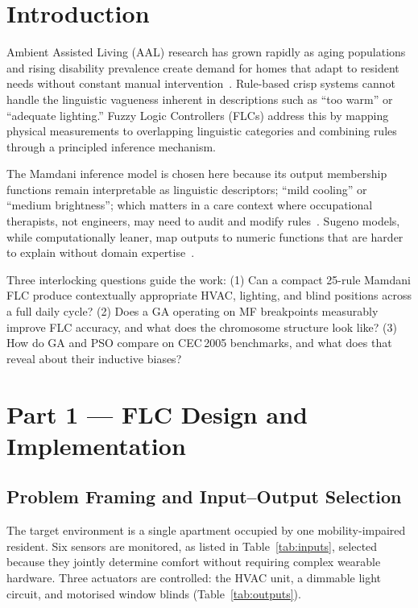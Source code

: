 \documentclass[10pt,twocolumn,a4paper]{article}
\begin{document}
\section{Introduction}
\label{sec:intro}

Ambient Assisted Living (AAL) research has grown rapidly as aging populations and rising disability prevalence create demand for homes that adapt to resident needs without constant manual intervention~\cite{demiris2014}. Rule-based crisp systems cannot handle the linguistic vagueness inherent in descriptions such as ``too warm'' or ``adequate lighting.'' Fuzzy Logic Controllers (FLCs) address this by mapping physical measurements to overlapping linguistic categories and combining rules through a principled inference mechanism.

The Mamdani inference model is chosen here because its output membership functions remain interpretable as linguistic descriptors; ``mild cooling'' or ``medium brightness''; which matters in a care context where occupational therapists, not engineers, may need to audit and modify rules~\cite{mamdani1975}. Sugeno models, while computationally leaner, map outputs to numeric functions that are harder to explain without domain expertise~\cite{sugeno1985}.

Three interlocking questions guide the work: (1) Can a compact 25-rule Mamdani FLC produce contextually appropriate HVAC, lighting, and blind positions across a full daily cycle? (2) Does a GA operating on MF breakpoints measurably improve FLC accuracy, and what does the chromosome structure look like? (3) How do GA and PSO compare on CEC\,2005 benchmarks, and what does that reveal about their inductive biases?

\section{Part 1 --- FLC Design and Implementation}
\label{sec:part1}

\subsection{Problem Framing and Input--Output Selection}

The target environment is a single apartment occupied by one mobility-impaired resident. Six sensors are monitored, as listed in Table~\ref{tab:inputs}, selected because they jointly determine comfort without requiring complex wearable hardware. Three actuators are controlled: the HVAC unit, a dimmable light circuit, and motorised window blinds (Table~\ref{tab:outputs}).
\end{document}
